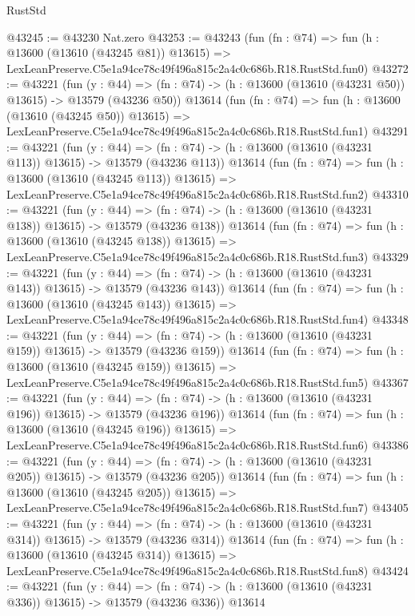 \begin{lexlean}{RustStd}
\begin{coremodule}
@43245 := @43230 Nat.zero
@43253 := @43243
    (fun (fn : @74) =>
    fun (h : @13600 (@13610 (@43245 @81)) @13615) =>
    LexLeanPreserve.C5e1a94ce78c49f496a815c2a4c0c686b.R18.RustStd.fun0)
@43272 := @43221
    (fun (y : @44) =>
    (fn : @74) -> (h : @13600 (@13610 (@43231 @50)) @13615) -> @13579 (@43236 @50))
    @13614
    (fun (fn : @74) =>
    fun (h : @13600 (@13610 (@43245 @50)) @13615) =>
    LexLeanPreserve.C5e1a94ce78c49f496a815c2a4c0c686b.R18.RustStd.fun1)
@43291 := @43221
    (fun (y : @44) =>
    (fn : @74) -> (h : @13600 (@13610 (@43231 @113)) @13615) -> @13579 (@43236 @113))
    @13614
    (fun (fn : @74) =>
    fun (h : @13600 (@13610 (@43245 @113)) @13615) =>
    LexLeanPreserve.C5e1a94ce78c49f496a815c2a4c0c686b.R18.RustStd.fun2)
@43310 := @43221
    (fun (y : @44) =>
    (fn : @74) -> (h : @13600 (@13610 (@43231 @138)) @13615) -> @13579 (@43236 @138))
    @13614
    (fun (fn : @74) =>
    fun (h : @13600 (@13610 (@43245 @138)) @13615) =>
    LexLeanPreserve.C5e1a94ce78c49f496a815c2a4c0c686b.R18.RustStd.fun3)
@43329 := @43221
    (fun (y : @44) =>
    (fn : @74) -> (h : @13600 (@13610 (@43231 @143)) @13615) -> @13579 (@43236 @143))
    @13614
    (fun (fn : @74) =>
    fun (h : @13600 (@13610 (@43245 @143)) @13615) =>
    LexLeanPreserve.C5e1a94ce78c49f496a815c2a4c0c686b.R18.RustStd.fun4)
@43348 := @43221
    (fun (y : @44) =>
    (fn : @74) -> (h : @13600 (@13610 (@43231 @159)) @13615) -> @13579 (@43236 @159))
    @13614
    (fun (fn : @74) =>
    fun (h : @13600 (@13610 (@43245 @159)) @13615) =>
    LexLeanPreserve.C5e1a94ce78c49f496a815c2a4c0c686b.R18.RustStd.fun5)
@43367 := @43221
    (fun (y : @44) =>
    (fn : @74) -> (h : @13600 (@13610 (@43231 @196)) @13615) -> @13579 (@43236 @196))
    @13614
    (fun (fn : @74) =>
    fun (h : @13600 (@13610 (@43245 @196)) @13615) =>
    LexLeanPreserve.C5e1a94ce78c49f496a815c2a4c0c686b.R18.RustStd.fun6)
@43386 := @43221
    (fun (y : @44) =>
    (fn : @74) -> (h : @13600 (@13610 (@43231 @205)) @13615) -> @13579 (@43236 @205))
    @13614
    (fun (fn : @74) =>
    fun (h : @13600 (@13610 (@43245 @205)) @13615) =>
    LexLeanPreserve.C5e1a94ce78c49f496a815c2a4c0c686b.R18.RustStd.fun7)
@43405 := @43221
    (fun (y : @44) =>
    (fn : @74) -> (h : @13600 (@13610 (@43231 @314)) @13615) -> @13579 (@43236 @314))
    @13614
    (fun (fn : @74) =>
    fun (h : @13600 (@13610 (@43245 @314)) @13615) =>
    LexLeanPreserve.C5e1a94ce78c49f496a815c2a4c0c686b.R18.RustStd.fun8)
@43424 := @43221
    (fun (y : @44) =>
    (fn : @74) -> (h : @13600 (@13610 (@43231 @336)) @13615) -> @13579 (@43236 @336))
    @13614

\end{coremodule}
\end{lexlean}
